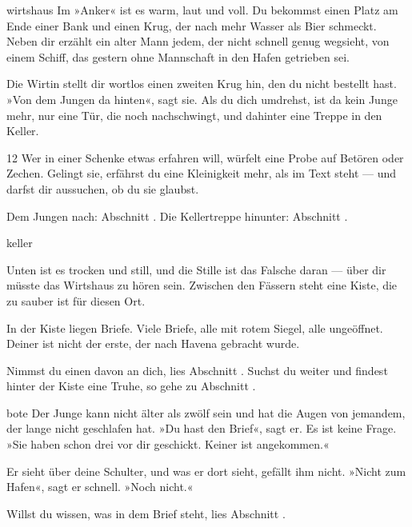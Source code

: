 \begin{soloBlock}{wirtshaus}
Im »Anker« ist es warm, laut und voll. Du bekommst einen Platz am Ende einer Bank
und einen Krug, der nach mehr Wasser als Bier schmeckt. Neben dir erzählt ein alter
Mann jedem, der nicht schnell genug wegsieht, von einem Schiff, das gestern ohne
Mannschaft in den Hafen getrieben sei.

Die Wirtin stellt dir wortlos einen zweiten Krug hin, den du nicht bestellt hast.
»Von dem Jungen da hinten«, sagt sie. Als du dich umdrehst, ist da kein Junge mehr,
nur eine Tür, die noch nachschwingt, und dahinter eine Treppe in den Keller.

\begin{dsaKastenFrei}{12}
Wer in einer Schenke etwas erfahren will, würfelt eine Probe auf Betören oder
Zechen. Gelingt sie, erfährst du eine Kleinigkeit mehr, als im Text steht — und
darfst dir aussuchen, ob du sie glaubst.
\end{dsaKastenFrei}

Dem Jungen nach: Abschnitt . Die Kellertreppe hinunter: Abschnitt
.
\end{soloBlock}

\begin{soloBlock}[zusammen]{keller}

Unten ist es trocken und still, und die Stille ist das Falsche daran — über dir
müsste das Wirtshaus zu hören sein. Zwischen den Fässern steht eine Kiste, die zu
sauber ist für diesen Ort.

In der Kiste liegen Briefe. Viele Briefe, alle mit rotem Siegel, alle ungeöffnet.
Deiner ist nicht der erste, der nach Havena gebracht wurde.

Nimmst du einen davon an dich, lies Abschnitt . Suchst du weiter
und findest hinter der Kiste eine Truhe, so gehe zu Abschnitt .
\end{soloBlock}

\begin{soloBlock}{bote}
Der Junge kann nicht älter als zwölf sein und hat die Augen von jemandem, der lange
nicht geschlafen hat. »Du hast den Brief«, sagt er. Es ist keine Frage. »Sie haben
schon drei vor dir geschickt. Keiner ist angekommen.«

Er sieht über deine Schulter, und was er dort sieht, gefällt ihm nicht. »Nicht zum
Hafen«, sagt er schnell. »Noch nicht.«

Willst du wissen, was in dem Brief steht, lies Abschnitt .
\end{soloBlock}

